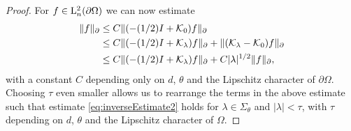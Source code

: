 \begin{proof}
  For $f \in \mathrm{L}^2_n(\partial\Omega)$ we can now estimate
  \begin{align*}
    \| f\|_\partial 
    &\leq C \|(-(1/2)I + \mathcal{K}_0) f \|_\partial  \\
    &\leq C \|(-(1/2)I + \mathcal{K}_\lambda)f \|_\partial + \|(\mathcal{K}_\lambda - \mathcal{K}_0)f\|_\partial \\
    &\leq C \|(-(1/2)I + \mathcal{K}_\lambda)f\|_\partial + C |\lambda|^{1/2} \|f\|_\partial,
  \end{align*}
  with a constant $C$ depending only on $d$, $\theta$ and the Lipschitz character of $\partial\Omega$.
  Choosing $\tau$ even smaller allows us to rearrange the terms in the above estimate such that estimate \eqref{eq:inverseEstimate2} holds for $\lambda \in \Sigma_\theta$ and $|\lambda| < \tau$, with $\tau$ depending on $d$, $\theta$ and the Lipschitz character of $\Omega$.


\end{proof}

